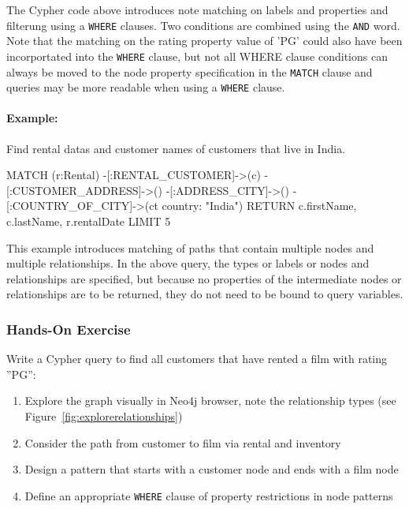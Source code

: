 The Cypher code above introduces note matching on labels and properties and filterung using a \texttt{WHERE} clauses. Two conditions are combined using the \texttt{AND} word. Note that the matching on the rating property value of 'PG' could also have been incorportated into the \texttt{WHERE} clause, but not all WHERE clause conditions can always be moved to the node property specification in the \texttt{MATCH} clause and queries may be more readable when using a \texttt{WHERE} clause. 

\paragraph*{Example:} Find rental datas and customer names of customers that live in India.

\begin{samepage}
\begin{cyphercode}
MATCH (r:Rental) 
        -[:RENTAL_CUSTOMER]->(c) 
        -[:CUSTOMER_ADDRESS]->() 
        -[:ADDRESS_CITY]->()
        -[:COUNTRY_OF_CITY]->(ct {country: "India"})
RETURN c.firstName, c.lastName, r.rentalDate LIMIT 5
\end{cyphercode}
\end{samepage}

This example introduces matching of paths that contain multiple nodes and multiple relationships. In the above query, the types or labels or nodes and relationships are specified, but because no properties of the intermediate nodes or relationships are to be returned, they do not need to be bound to query variables.


\begin{tcolorbox}[colback=code]
\subsubsection*{Hands-On Exercise}

Write a Cypher query to find all customers that have rented a film with rating ''PG'':

\begin{enumerate}
  \item Explore the graph visually in Neo4j browser, note the relationship types (see Figure~\ref{fig:explorerelationships})
  \item Consider the path from customer to film via rental and inventory
  \item Design a pattern that starts with a customer node and ends with a film node
  \item Define an appropriate \texttt{WHERE} clause of property restrictions in node patterns
\end{enumerate}
\end{tcolorbox}

